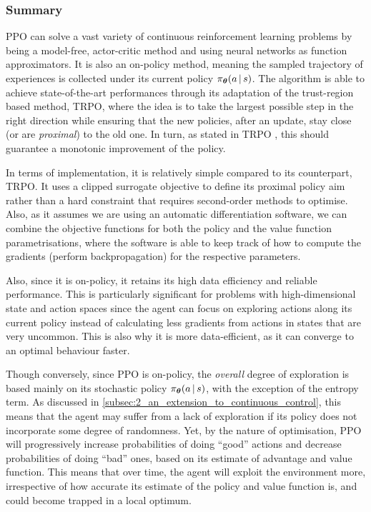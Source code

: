 \subsubsection{Summary}
PPO can solve a vast variety of continuous reinforcement learning problems by being a model-free, actor-critic method and using neural networks as function approximators. It is also an on-policy method, meaning the sampled trajectory of experiences is collected under its current policy $\pi_{\boldsymbol{\theta}} (a \, | \, s)$. The algorithm is able to achieve state-of-the-art performances through its adaptation of the trust-region based method, TRPO, where the idea is to take the largest possible step in the right direction while ensuring that the new policies, after an update, stay close (or are \textit{proximal}) to the old one. In turn, as stated in TRPO \cite{TRPO}, this should guarantee a monotonic improvement of the policy.

In terms of implementation, it is relatively simple compared to its counterpart, TRPO. It uses a clipped surrogate objective to define its proximal policy aim rather than a hard constraint that requires second-order methods to optimise. Also, as it assumes we are using an automatic differentiation software, we can combine the objective functions for both the policy and the value function parametrisations, where the software is able to keep track of how to compute the gradients (perform backpropagation) for the respective parameters.

Also, since it is on-policy, it retains its high data efficiency and reliable performance. This is particularly significant for problems with high-dimensional state and action spaces since the agent can focus on exploring actions along its current policy instead of calculating less gradients from actions in states that are very uncommon. This is also why it is more data-efficient, as it can converge to an optimal behaviour faster.

Though conversely, since PPO is on-policy, the \textit{overall} degree of exploration is based mainly on its stochastic policy $\pi_{\boldsymbol{\theta}} (a \, | \, s)$, with the exception of the entropy term. As discussed in \cref{subsec:2_an_extension_to_continuous_control}, this means that the agent may suffer from a lack of exploration if its policy does not incorporate some degree of randomness. Yet, by the nature of optimisation, PPO will progressively increase probabilities of doing ``good'' actions and decrease probabilities of doing ``bad'' ones, based on its estimate of advantage and value function. This means that over time, the agent will exploit the environment more, irrespective of how accurate its estimate of the policy and value function is, and could become trapped in a local optimum. 

